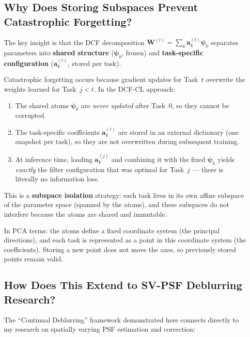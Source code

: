 \documentclass[11pt,letterpaper]{article}
\newcommand{\W}{\mathbf{W}}
\renewcommand{\a}{\mathbf{a}}
\newcommand{\psivec}{\boldsymbol{\psi}}
\begin{document}
\subsection{Why Does Storing Subspaces Prevent Catastrophic Forgetting?}

The key insight is that the DCF decomposition
$\W^{(t)} = \sum_k \a_k^{(t)} \psivec_k$ separates parameters into
\textbf{shared structure} ($\psivec_k$, frozen) and
\textbf{task-specific configuration} ($\a_k^{(t)}$, stored per task).

Catastrophic forgetting occurs because gradient updates for Task~$t$ overwrite
the weights learned for Task~$j < t$.  In the DCF-CL approach:
\begin{enumerate}[leftmargin=*]
    \item The shared atoms $\psivec_k$ are \emph{never updated} after Task~0,
          so they cannot be corrupted.
    \item The task-specific coefficients $\a_k^{(t)}$ are stored in an
          external dictionary (one snapshot per task), so they are not
          overwritten during subsequent training.
    \item At inference time, loading $\a_k^{(j)}$ and combining it with the
          fixed $\psivec_k$ yields \emph{exactly} the filter configuration
          that was optimal for Task~$j$ --- there is literally no information
          loss.
\end{enumerate}

This is a \textbf{subspace isolation} strategy: each task lives in its own
affine subspace of the parameter space (spanned by the atoms), and these
subspaces do not interfere because the atoms are shared and immutable.

In PCA terms: the atoms define a fixed coordinate system (the principal
directions), and each task is represented as a point in this coordinate system
(the coefficients).  Storing a new point does not move the axes, so
previously stored points remain valid.

\subsection{How Does This Extend to SV-PSF Deblurring Research?}

The ``Continual Deblurring'' framework demonstrated here connects directly to
my research on spatially varying PSF estimation and correction:
\end{document}
